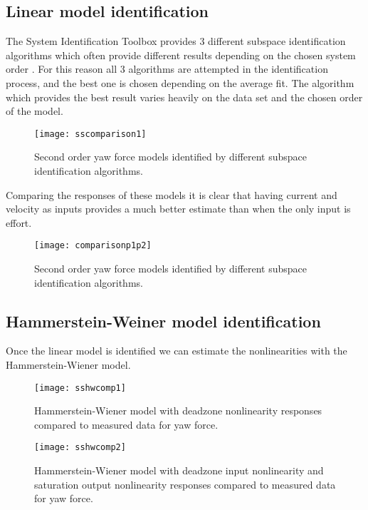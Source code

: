 \subsection{Linear model identification}

The System Identification Toolbox provides 3 different subspace identification algorithms which often provide different results depending on the chosen system order \cite{van1994n4sid}. 
For this reason all 3 algorithms are attempted in the identification process, and the best one is chosen depending on the average fit.
The algorithm which provides the best result varies heavily on the data set and the chosen order of the model.

\begin{figure}[H]
\centering
\hspace{-2em}\texttt{[image: sscomparison1]}
\caption{Second order yaw force models identified by different subspace identification algorithms.}
\label{fig:1LMI}
\end{figure}



Comparing the responses of these models it is clear that having current and velocity as inputs provides a much better estimate than when the only input is effort.

\begin{figure}[H]
\centering
\hspace{-2em}\texttt{[image: comparisonp1p2]}
\caption{Second order yaw force models identified by different subspace identification algorithms.}
\label{fig:1LMI2}
\end{figure}
\subsection{Hammerstein-Weiner model identification}

Once the linear model is identified we can estimate the nonlinearities with the Hammerstein-Wiener model.

\begin{figure}[H]
\centering
\hspace{-2.5em}\texttt{[image: sshwcomp1]}
\caption{Hammerstein-Wiener model with deadzone nonlinearity responses compared to measured data for yaw force.}
\label{fig:2LMI}
\end{figure}

\begin{figure}[H]
\centering
\hspace{-2.5em}\texttt{[image: sshwcomp2]}
\caption{Hammerstein-Wiener model with deadzone input nonlinearity and saturation output nonlinearity responses compared to measured data for yaw force.}
\label{fig:2LMI1}
\end{figure}

